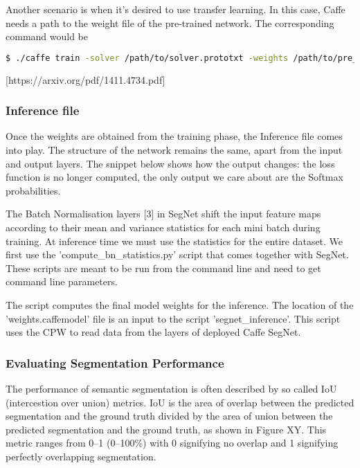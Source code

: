 Another scenario is when it's desired to use transfer learning. In this case, Caffe needs a path to the weight file of the pre-trained network. The corresponding command would be

\begin{lstlisting}[language=bash]
$ ./caffe train -solver /path/to/solver.prototxt -weights /path/to/pre_trained_weights.caffemodel
\end{lstlisting}


 [https://arxiv.org/pdf/1411.4734.pdf]

\subsubsection{Inference file}

Once the weights are obtained from the training phase, the Inference file comes into play. The structure of the network remains the same, apart from the input and output layers. The snippet below shows how the output changes: the loss function is no longer computed, the only output we care about are the Softmax probabilities. 

The Batch Normalisation layers [3] in SegNet shift the input feature maps according to their mean and variance statistics for each mini batch during training. At inference time we must use the statistics for the entire dataset. 
We first use the 'compute\_bn\_statistics.py' script that comes together with SegNet. These scripts are meant to be run from the command line and need to get command line parameters. 

The script computes the final model weights for the inference. The location of the 'weights.caffemodel' file is an input to the script 'segnet\_inference'. This script uses the CPW to read data from the layers of deployed Caffe SegNet. 

\subsubsection{Evaluating Segmentation Performance}

The performance of semantic segmentation is often described by so called IoU (intercestion over union) metrics. IoU is the area of overlap between the predicted segmentation and the ground truth divided by the area of union between the predicted segmentation and the ground truth, as shown in Figure XY. This metric ranges from 0–1 (0–100\%) with 0 signifying no overlap and 1 signifying perfectly overlapping segmentation.

